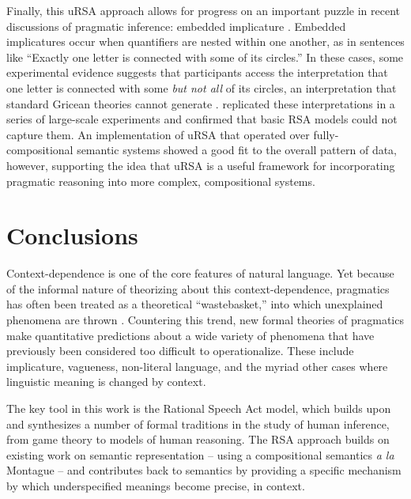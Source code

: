 \documentclass[]{elsarticle}
\begin{document}
Finally, this uRSA approach allows for progress on an important puzzle
in recent discussions of pragmatic inference: embedded implicature \citep{geurts2009,chemla2011}. Embedded
implicatures occur when quantifiers are nested within one another, as in
sentences like ``Exactly one letter is connected with some of its
circles.'' In these cases, some experimental evidence suggests that
participants access the interpretation that one letter is connected with
some \emph{but not all} of its circles, an interpretation that standard
Gricean theories cannot generate \citep{chemla2011}. \citet{potts2015} replicated these interpretations in a series of large-scale
experiments and confirmed that basic RSA models could not capture them.
An implementation of uRSA that operated over fully-compositional
semantic systems showed a good fit to the overall pattern of data, however, supporting the idea that uRSA is a useful framework for incorporating pragmatic
reasoning into more complex, compositional systems.

\section{Conclusions}\label{conclusions-and-future-directions}

Context-dependence is one of the core features of natural language. Yet
because of the informal nature of theorizing about this context-dependence,
pragmatics has often been treated as a theoretical ``wastebasket,'' into
which unexplained phenomena are thrown \citep{bar-hillel1971}. Countering this trend, new formal theories of pragmatics make quantitative
predictions about a wide variety of phenomena that have previously been
considered too difficult to operationalize. These include implicature,
vagueness, non-literal language, and the myriad other cases where
linguistic meaning is changed by context.

The key tool in this work is the Rational Speech Act model, which builds upon and synthesizes a
number of formal traditions in the study of human inference, from game
theory to models of human reasoning. The RSA approach builds on existing
work on semantic representation -- using a compositional semantics
\emph{a la} Montague \citet{dowty2012} -- and contributes back to semantics by providing a
specific mechanism by which underspecified meanings become precise, in
context.

\end{document}
